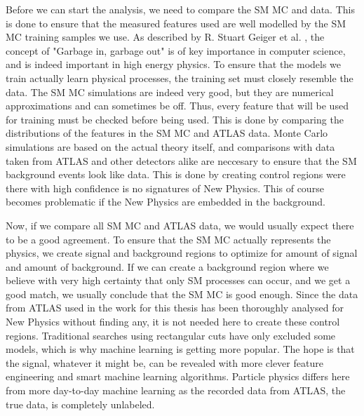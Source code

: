 Before we can start the analysis, we need to compare the SM MC and data. This is done to ensure that the measured features used 
are well modelled by the SM MC training samples we use. As described by R. Stuart Geiger et al. \cite{DBLP:journals/corr/abs-2107-02278}, the concept of "Garbage 
in, garbage out" is of key importance in computer science, and is indeed important in high energy physics. To ensure that the models 
we train actually learn physical processes, the training set must closely resemble the data. The SM MC simulations are indeed very good, 
but they are numerical approximations and can 
sometimes be off. Thus, every feature that will be used for training must be checked before being used. This is done by 
comparing the distributions of the features in the SM MC and ATLAS data. Monte Carlo simulations are based on the actual theory 
itself, and comparisons with data taken from ATLAS and other detectors alike are neccesary to ensure that the SM background 
events look like data. This is done by creating control regions were there with high confidence is no signatures of New Physics. 
This of course becomes problematic if the New Physics are embedded in the background.\par
Now, if we compare all SM MC and ATLAS data, we would usually expect there to be a good agreement. To ensure that the SM MC actually 
represents the physics, we create signal and background regions to optimize for amount of signal and amount of background. If we can 
create a background region where we believe with very high certainty that only SM processes can occur, and we get a good match, 
we usually conclude that the SM MC is good enough. Since the data from ATLAS used in the work for this thesis has been thoroughly 
analysed for New Physics without finding any, it is not needed here to create these control regions. Traditional searches using 
rectangular cuts have only excluded some models, which is why machine learning is getting more popular. The hope is that the signal, 
whatever it might be, can be revealed with more clever feature engineering and smart machine learning algorithms. 
Particle physics differs here from more day-to-day machine learning as the recorded data from ATLAS, the true data, is completely 
unlabeled. 


